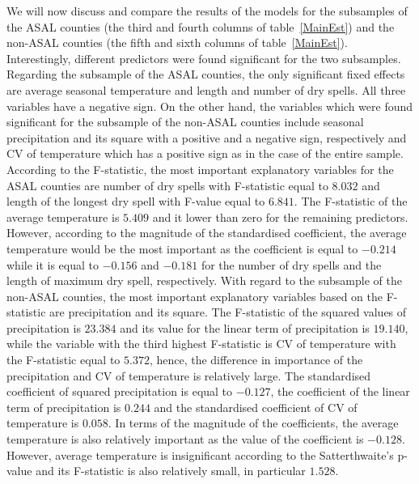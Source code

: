\documentclass[12pt]{iopart}
\begin{document}
We will now discuss and compare the results of the models for the subsamples of the ASAL counties (the third and fourth columns of table~\ref{MainEst}) and the non-ASAL counties (the fifth and sixth columns of table~\ref{MainEst}). Interestingly, different predictors were  found significant for the two subsamples. Regarding the subsample of the ASAL counties, the only significant fixed effects are average seasonal temperature and length and number of dry spells. All three variables have a negative sign. On the other hand, the variables which were found significant for the subsample of the non-ASAL counties include seasonal precipitation and its square with a positive and a negative sign, respectively and CV of temperature which has a positive sign as in the case of the entire sample. According to the F-statistic, the most important explanatory variables for the ASAL counties are number of dry spells with F-statistic equal to $8.032$ and length of the longest dry spell with F-value equal to $6.841$. The F-statistic of the average temperature is $5.409$ and it lower than zero for the remaining predictors. However, according to the magnitude of the standardised coefficient, the average temperature would be the most important as the coefficient is equal to $-0.214$ while it is equal to $-0.156$ and $-0.181$ for the number of dry spells and the length of maximum dry spell, respectively. With regard to the subsample of the non-ASAL counties, the most important explanatory variables based on the F-statistic are precipitation and its square. The F-statistic of the squared values of precipitation is $23.384$ and its value for the linear term of precipitation is $19.140$, while the variable with the third highest F-statistic is CV of temperature with the F-statistic equal to $5.372$, hence, the difference in importance of the precipitation and CV of temperature is relatively large. The standardised coefficient of squared precipitation is equal to $-0.127$, the coefficient of the linear term of precipitation is $0.244$ and the standardised coefficient of CV of temperature is $0.058$. In terms of the magnitude of the coefficients, the average temperature is also relatively important as the value of the coefficient is $-0.128$. However, average temperature is insignificant according to the Satterthwaite's p-value and its F-statistic is also relatively small, in particular $1.528$.
\end{document}
